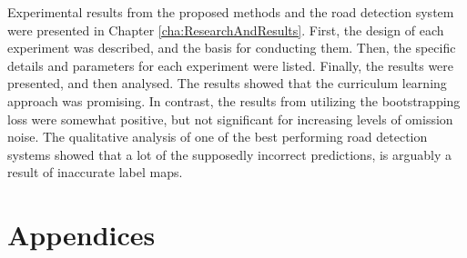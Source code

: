 \documentclass[a4paper]{book}
\begin{document}
Experimental results from the proposed methods and the road detection system were presented in Chapter \ref{cha:ResearchAndResults}. First, the design of each experiment was described, and the basis for conducting them. Then, the specific details and parameters for each experiment were listed. Finally, the results were presented, and then analysed. The results showed that the curriculum learning approach was promising. In contrast, the results from utilizing the bootstrapping loss were somewhat positive, but not significant for increasing levels of omission noise. The qualitative analysis of one of the best performing road detection systems showed that a lot of the supposedly incorrect predictions, is arguably a result of inaccurate label maps.\\







\backmatter


\appendix
\chapter*{Appendices}
\renewcommand{\thesection}{\Alph{section}}




\end{document}
